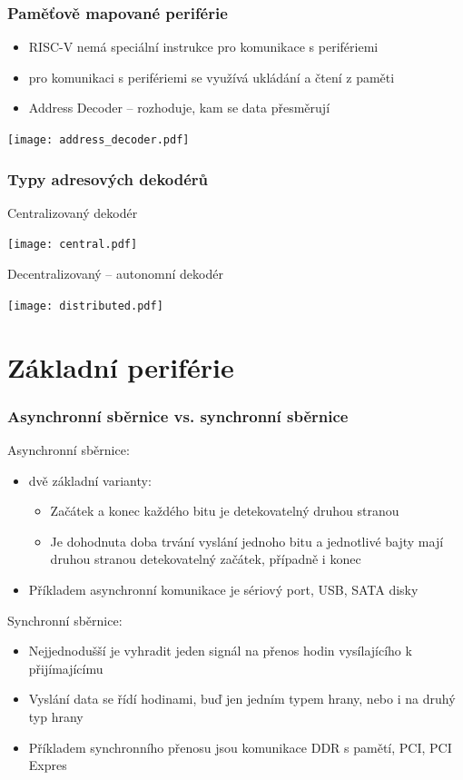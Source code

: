 \documentclass{beamer}
\begin{document}
\begin{frame}
\frametitle{Paměťově mapované periférie}

\begin{itemize}
\item RISC-V nemá speciální instrukce pro komunikace s perifériemi
\item pro komunikaci s perifériemi se využívá ukládání a čtení z paměti
\item Address Decoder -- rozhoduje, kam se data přesměrují
\end{itemize}
\begin{center}
\texttt{[image: address\_decoder.pdf]}
\end{center}
\end{frame}


\begin{frame}
\frametitle{Typy adresových dekodérů}

Centralizovaný dekodér

\begin{center}
\texttt{[image: central.pdf]}
\end{center}

Decentralizovaný -- autonomní dekodér

\begin{center}
\texttt{[image: distributed.pdf]}
\end{center}
\end{frame}

\section{Základní periférie}


\begin{frame}
\frametitle{Asynchronní sběrnice vs. synchronní sběrnice}

Asynchronní sběrnice:
\begin{itemize}
\item  dvě základní varianty:
\begin{itemize}
\item Začátek a konec každého bitu je detekovatelný druhou stranou
\item Je dohodnuta doba trvání vyslání jednoho bitu a jednotlivé bajty mají druhou stranou detekovatelný začátek, případně i konec
\end{itemize}
\item Příkladem asynchronní komunikace je sériový port, USB, SATA disky
\end{itemize}


Synchronní sběrnice:
\begin{itemize}
\item Nejjednodušší je vyhradit jeden signál na přenos hodin vysílajícího k přijímajícímu
\item Vyslání data se řídí hodinami, buď jen jedním typem hrany, nebo i na druhý typ hrany
\item Příkladem synchronního přenosu jsou komunikace DDR s pamětí, PCI, PCI Expres
\end{itemize}
\end{frame}
\end{document}
